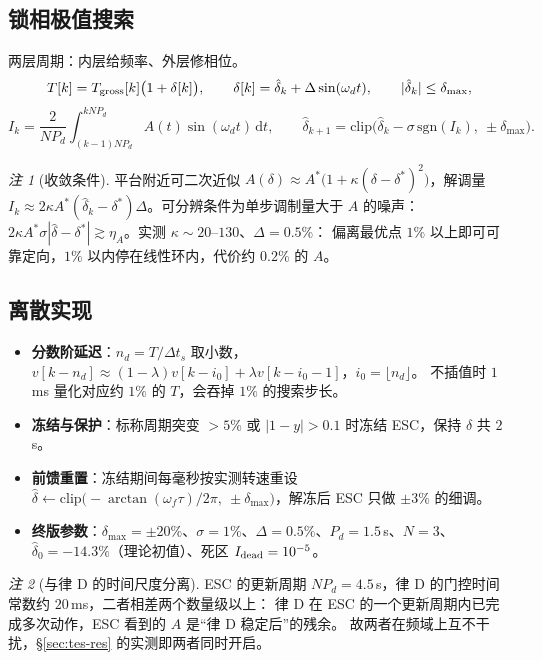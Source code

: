 \documentclass[11pt,a4paper]{article}
\theoremstyle{remark}\newtheorem{remark}{注}
\begin{document}
\subsection{锁相极值搜索}\label{sec:tes-esc}
两层周期：内层给频率、外层修相位。
\begin{equation}
T[k]=T_{\rm gross}[k]\bigl(1+\delta[k]\bigr),\qquad
\delta[k]=\hat\delta_k+\Delta\sin(\omega_d t),\qquad |\hat\delta_k|\le\delta_{\max},
\label{eq:tes-two-layer}
\end{equation}
\begin{equation}
I_k=\frac{2}{NP_d}\int_{(k-1)NP_d}^{kNP_d}A(t)\sin(\omega_d t)\,\mathrm dt,
\qquad
\hat\delta_{k+1}=\mathrm{clip}\bigl(\hat\delta_k-\sigma\,\mathrm{sgn}(I_k),\ \pm\delta_{\max}\bigr).
\label{eq:tes-esc}
\end{equation}
\begin{remark}[收敛条件]\label{rem:tes-conv}
平台附近可二次近似 $A(\delta)\approx A^{*}\bigl(1+\kappa(\delta-\delta^{*})^{2}\bigr)$，解调量
$I_k\approx2\kappa A^{*}(\hat\delta_k-\delta^{*})\Delta$。可分辨条件为单步调制量大于 $A$ 的噪声：
$2\kappa A^{*}\sigma|\hat\delta-\delta^{*}|\gtrsim\eta_A$。实测 $\kappa\sim20$--$130$、$\Delta=0.5\%$：
偏离最优点 $1\%$ 以上即可可靠定向，$1\%$ 以内停在线性环内，代价约 $0.2\%$ 的 $A$。
\end{remark}

\subsection{离散实现}\label{sec:tes-impl}
\begin{itemize}
  \item \textbf{分数阶延迟}：$n_d=T/\Delta t_s$ 取小数，$v[k-n_d]\approx(1-\lambda)v[k-i_0]+\lambda v[k-i_0-1]$，$i_0=\lfloor n_d\rfloor$。
        不插值时 $1$\,ms 量化对应约 $1\%$ 的 $T$，会吞掉 $1\%$ 的搜索步长。
  \item \textbf{冻结与保护}：标称周期突变 $>5\%$ 或 $|1-y|>0.1$ 时冻结 ESC，保持 $\hat\delta$ 共 $2$\,s。
  \item \textbf{前馈重置}：冻结期间每毫秒按实测转速重设
        $\hat\delta\leftarrow\mathrm{clip}\bigl(-\arctan(\omega_f\tau)/2\pi,\ \pm\delta_{\max}\bigr)$，解冻后 ESC 只做 $\pm3\%$ 的细调。
  \item \textbf{终版参数}：$\delta_{\max}=\pm20\%$、$\sigma=1\%$、$\Delta=0.5\%$、$P_d=1.5$\,s、$N=3$、
        $\hat\delta_0=-14.3\%$（理论初值）、死区 $I_{\rm dead}=10^{-5}$。
\end{itemize}
\begin{remark}[与律 D 的时间尺度分离]\label{rem:tes-lawd}
ESC 的更新周期 $NP_d=4.5$\,s，律 D 的门控时间常数约 $20$\,ms，二者相差两个数量级以上：
律 D 在 ESC 的一个更新周期内已完成多次动作，ESC 看到的 $A$ 是“律 D 稳定后”的残余。
故两者在频域上互不干扰，§\ref{sec:tes-res} 的实测即两者同时开启。
\end{remark}
\end{document}
